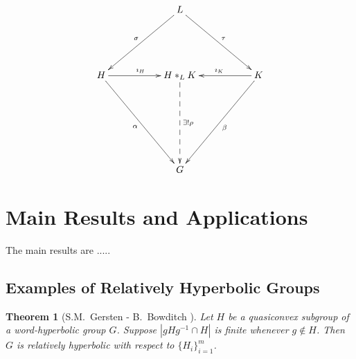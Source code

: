 \documentclass[12pt]{report}
\newtheorem{theorem}{Theorem}[chapter]
\theoremstyle{definition}
\theoremstyle{remark}
\numberwithin{equation}{chapter}
\numberwithin{figure}{chapter}
\newcommand{\Hs}{\{ H_i \}_{i=1}^m}
\begin{document}
\begin{displaymath}
\xymatrix{
                                                                            & & L \ar@{->}[lldd]_{\sigma} \ar@{->}[rrdd]^{\tau}         & &                                                                  \\
                                                                            & &                                                                                     & &                                                                      \\
    H \ar@{->}[rr]^{\imath_H} \ar@{->}[dddrr]_\alpha                &   &   H\ast_L K \ar@{-->}[ddd]^{\exists ! \rho}   & &  K \ar@{->}[ll]_{\imath_K}  \ar@{->}[dddll]^\beta           \\
                                                                            & &                                                                                     & &                                                                         \\
                                                                            & &                                                                                     & &                                                                         \\
                                                                            & & G                                                                                   & &
}
\end{displaymath}


\section{Main Results and Applications}

The main results are .....

\subsection{Examples of Relatively Hyperbolic Groups}

\begin{theorem}[S.M.\ Gersten \cite{Ge96} - B.\ Bowditch \cite{BO99} ] \label{thm:gersten_bowditch}
Let $H$ be a quasiconvex subgroup of a word-hyperbolic group $G$. Suppose $|gHg^{-1} \cap H |$ is finite whenever $g \not \in H$. Then $G$ is relatively hyperbolic with respect to $\Hs$.
\end{theorem}
\end{document}
